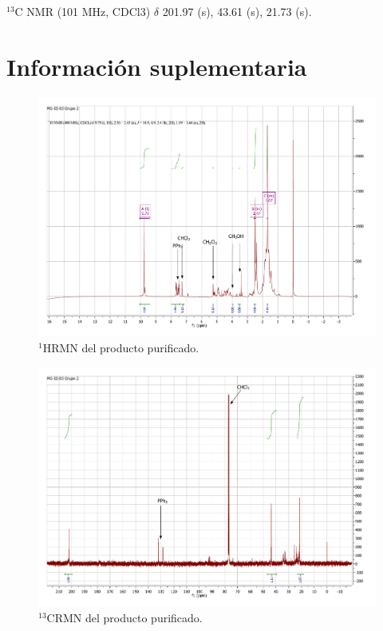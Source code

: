 \documentclass[fleqn,10pt]{SelfArx}
\begin{document}
$^{13}$C NMR (101 MHz, CDCl3) $\delta$ 201.97 (s), 43.61 (s), 21.73 (s).

\newpage
{}



\newpage
\onecolumn
\section{Informaci\'on suplementaria}\label{sec: complementaria}
\begin{figure}[h]
	\centering
	\includegraphics[width=0.5\textheight]{RMN/H.pdf}
	\caption{$^1$HRMN del producto purificado.}
	\label{HRMN}
\end{figure}
\begin{figure}[h]
	\centering
	\includegraphics[width=0.5\textheight]{RMN/C.pdf}
	\caption{$^{13}$CRMN del producto purificado.}
\end{figure}
\end{document}
